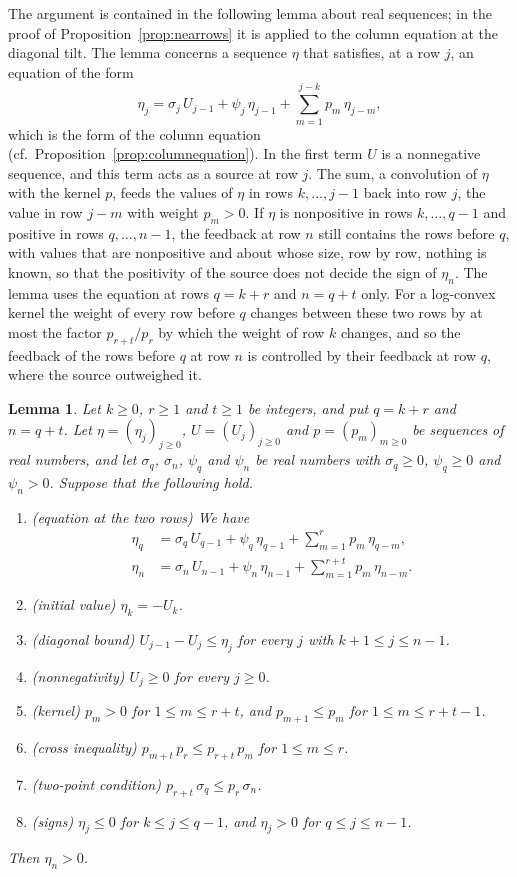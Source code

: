 \documentclass{amsart}
\newtheorem{lemma}[theorem]{Lemma}
\theoremstyle{definition}
\theoremstyle{remark}
\numberwithin{equation}{section}
\begin{document}
The argument is contained in the following lemma about real sequences; in the proof of Proposition~\ref{prop:nearrows} it is applied to the column equation at the diagonal tilt. The lemma concerns a sequence $\eta$ that satisfies, at a row $j$, an equation of the form
\[
\eta_j=\sigma_j\,U_{j-1}+\psi_j\,\eta_{j-1}+\sum_{m=1}^{j-k}p_m\,\eta_{j-m},
\]
which is the form of the column equation (cf.\ Proposition~\ref{prop:columnequation}). In the first term $U$ is a nonnegative sequence, and this term acts as a source at row $j$. The sum, a convolution of $\eta$ with the kernel $p$, feeds the values of $\eta$ in rows $k,\dots,j-1$ back into row $j$, the value in row $j-m$ with weight $p_m>0$. If $\eta$ is nonpositive in rows $k,\dots,q-1$ and positive in rows $q,\dots,n-1$, the feedback at row $n$ still contains the rows before $q$, with values that are nonpositive and about whose size, row by row, nothing is known, so that the positivity of the source does not decide the sign of $\eta_n$. The lemma uses the equation at rows $q=k+r$ and $n=q+t$ only. For a log-convex kernel the weight of every row before $q$ changes between these two rows by at most the factor $p_{r+t}/p_r$ by which the weight of row $k$ changes, and so the feedback of the rows before $q$ at row $n$ is controlled by their feedback at row $q$, where the source outweighed it.

\begin{lemma}\label{lem:tworows}
Let $k\ge 0$, $r\ge 1$ and $t\ge 1$ be integers, and put $q=k+r$ and $n=q+t$. Let $\eta=(\eta_j)_{j\ge 0}$, $U=(U_j)_{j\ge 0}$ and $p=(p_m)_{m\ge 0}$ be sequences of real numbers, and let $\sigma_q$, $\sigma_n$, $\psi_q$ and $\psi_n$ be real numbers with $\sigma_q\ge 0$, $\psi_q\ge 0$ and $\psi_n>0$. Suppose that the following hold.
\begin{enumerate}
\item (equation at the two rows) We have
\begin{align*}
\eta_q&=\sigma_q\,U_{q-1}+\psi_q\,\eta_{q-1}+\sum_{m=1}^{r}p_m\,\eta_{q-m},\\
\eta_n&=\sigma_n\,U_{n-1}+\psi_n\,\eta_{n-1}+\sum_{m=1}^{r+t}p_m\,\eta_{n-m}.
\end{align*}
\item (initial value) $\eta_k=-U_k$.
\item (diagonal bound) $U_{j-1}-U_j\le\eta_j$ for every $j$ with $k+1\le j\le n-1$.
\item (nonnegativity) $U_j\ge 0$ for every $j\ge 0$.
\item (kernel) $p_m>0$ for $1\le m\le r+t$, and $p_{m+1}\le p_m$ for $1\le m\le r+t-1$.
\item (cross inequality) $p_{m+t}\,p_r\le p_{r+t}\,p_m$ for $1\le m\le r$.
\item (two-point condition) $p_{r+t}\,\sigma_q\le p_r\,\sigma_n$.
\item (signs) $\eta_j\le 0$ for $k\le j\le q-1$, and $\eta_j>0$ for $q\le j\le n-1$.
\end{enumerate}
Then $\eta_n>0$.
\end{lemma}
\end{document}
